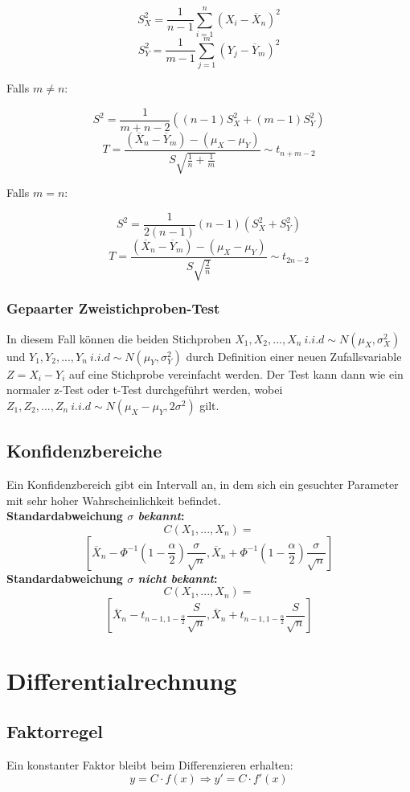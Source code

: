 \documentclass[10pt,a4paper,twocolumn]{article}
\begin{document}
\[
S_{X}^{2}=\frac{1}{n-1}\sum\limits_{i=1}^{n}\left(X_i-\overline{X}_n\right)^2
\]
\[
S_{Y}^{2}=\frac{1}{m-1}\sum\limits_{j=1}^{m}\left(Y_j-\overline{Y}_m\right)^2
\]

Falls $m\neq n$:

\[
S^2=\frac{1}{m+n-2}\left((n-1)S_{X}^{2}+(m-1)S_{Y}^{2}\right)
\]
\[
T = \frac{\left(\overline{X}_n-\overline{Y}_m\right)-\left(\mu_X-\mu_Y\right)}{S\sqrt{\frac{1}{n}+\frac{1}{m}}}\sim t_{n+m-2}
\]

Falls $m=n$:

\[
S^2=\frac{1}{2(n-1)}(n-1)\left(S_{X}^{2}+S_{Y}^{2}\right)
\]
\[
T = \frac{\left(\overline{X}_n-\overline{Y}_m\right)-\left(\mu_X-\mu_Y\right)}{S\sqrt{\frac{2}{n}}}\sim t_{2n-2}
\]

\subsubsection{Gepaarter Zweistichproben-Test}
In diesem Fall können die beiden Stichproben $X_1,X_2,...,X_n\ i.i.d\sim N(\mu_X,\sigma_X^2)$ und $Y_1,Y_2,...,Y_n\ i.i.d\sim N(\mu_Y,\sigma_Y^2)$ durch Definition einer neuen Zufallsvariable $Z=X_i-Y_i$ auf eine Stichprobe vereinfacht werden. Der Test kann dann wie ein normaler z-Test oder t-Test durchgeführt werden, wobei $Z_1,Z_2,...,Z_n\ i.i.d\sim N(\mu_X-\mu_Y,2\sigma^2)$ gilt.

\subsection{Konfidenzbereiche}
Ein Konfidenzbereich gibt ein Intervall an, in dem sich ein gesuchter Parameter mit sehr hoher Wahrscheinlichkeit befindet.\\

\textbf{Standardabweichung $\sigma$ \emph{bekannt}:}
\[
C(X_1,...,X_n)=
\]
\[
\left[\overline{X}_n-\Phi^{-1}\left(1-\frac{\alpha}{2}\right)\frac{\sigma}{\sqrt{n}},
\overline{X}_n+\Phi^{-1}\left(1-\frac{\alpha}{2}\right)\frac{\sigma}{\sqrt{n}}\right]
\]
\textbf{Standardabweichung $\sigma$ \emph{nicht bekannt}:}
\[
C(X_1,...,X_n)=
\]
\[
\left[\overline{X}_n-t_{n-1,1-\frac{\alpha}{2}}\frac{S}{\sqrt{n}},
\overline{X}_n+t_{n-1,1-\frac{\alpha}{2}}\frac{S}{\sqrt{n}}\right]
\]

\section{Differentialrechnung}

\subsection{Faktorregel}
Ein konstanter Faktor bleibt beim Differenzieren erhalten:
\[
y=C\cdot f(x)\Rightarrow y'=C\cdot f'(x)
\]
\end{document}
